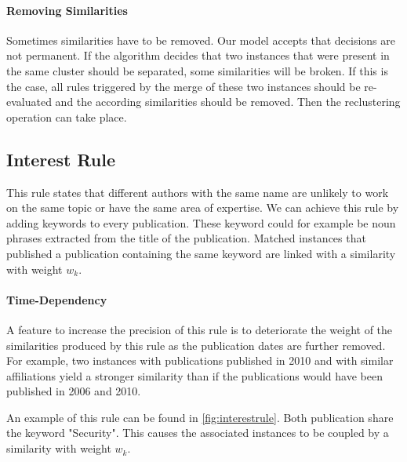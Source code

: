 \paragraph{Removing Similarities} Sometimes similarities have to be removed. Our model accepts that decisions are not permanent. If the algorithm decides that two instances that were present in the same cluster should be separated, some similarities will be broken. If this is the case, all rules triggered by the merge of these two instances should be re-evaluated and the according similarities should be removed. Then the reclustering operation can take place.

\subsection{Interest Rule}

This rule states that different authors with the same name are unlikely to work on the same topic or have the same area of expertise. We can achieve this rule by adding keywords to every publication. These keyword could for example be noun phrases extracted from the title of the publication. Matched instances that published a publication containing the same keyword are linked with a similarity with weight $w_k$.

\paragraph{Time-Dependency} A feature to increase the precision of this rule is to deteriorate the weight of the similarities produced by this rule as the publication dates are further removed. For example, two instances with publications published in 2010 and with similar affiliations yield a stronger similarity than if the publications would have been published in 2006 and 2010.

An example of this rule can be found in \autoref{fig:interestrule}. Both publication share the keyword "Security". This causes the associated instances to be coupled by a similarity with weight $w_k$.


